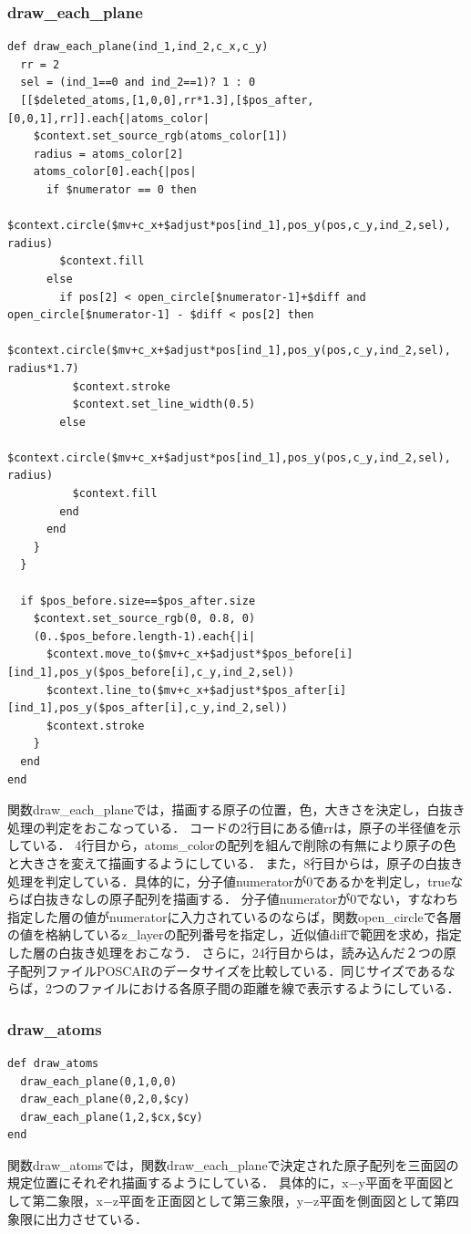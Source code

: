 \subsubsection{draw\_each\_plane}\begin{lstlisting}[style=customRuby,basicstyle={\scriptsize\ttfamily}]
def draw_each_plane(ind_1,ind_2,c_x,c_y)
  rr = 2
  sel = (ind_1==0 and ind_2==1)? 1 : 0
  [[$deleted_atoms,[1,0,0],rr*1.3],[$pos_after,[0,0,1],rr]].each{|atoms_color|
    $context.set_source_rgb(atoms_color[1])
    radius = atoms_color[2]
    atoms_color[0].each{|pos|
      if $numerator == 0 then
        $context.circle($mv+c_x+$adjust*pos[ind_1],pos_y(pos,c_y,ind_2,sel), radius)
        $context.fill
      else
        if pos[2] < open_circle[$numerator-1]+$diff and open_circle[$numerator-1] - $diff < pos[2] then
          $context.circle($mv+c_x+$adjust*pos[ind_1],pos_y(pos,c_y,ind_2,sel), radius*1.7)
          $context.stroke
          $context.set_line_width(0.5)
        else
          $context.circle($mv+c_x+$adjust*pos[ind_1],pos_y(pos,c_y,ind_2,sel), radius)
          $context.fill
        end
      end
    }
  }

  if $pos_before.size==$pos_after.size
    $context.set_source_rgb(0, 0.8, 0)
    (0..$pos_before.length-1).each{|i|
      $context.move_to($mv+c_x+$adjust*$pos_before[i][ind_1],pos_y($pos_before[i],c_y,ind_2,sel))
      $context.line_to($mv+c_x+$adjust*$pos_after[i][ind_1],pos_y($pos_after[i],c_y,ind_2,sel))
      $context.stroke
    }
  end
end
\end{lstlisting}
関数draw\_each\_planeでは，描画する原子の位置，色，大きさを決定し，白抜き処理の判定をおこなっている．
コードの2行目にある値rrは，原子の半径値を示している．
4行目から，atoms\_colorの配列を組んで削除の有無により原子の色と大きさを変えて描画するようにしている．
また，8行目からは，原子の白抜き処理を判定している．具体的に，分子値numeratorが0であるかを判定し，trueならば白抜きなしの原子配列を描画する．
分子値numeratorが0でない，すなわち指定した層の値がnumeratorに入力されているのならば，関数open\_circleで各層の値を格納しているz\_layerの配列番号を指定し，近似値diffで範囲を求め，指定した層の白抜き処理をおこなう．
さらに，24行目からは，読み込んだ２つの原子配列ファイルPOSCARのデータサイズを比較している．同じサイズであるならば，2つのファイルにおける各原子間の距離を線で表示するようにしている．

\subsubsection{draw\_atoms}\begin{lstlisting}[style=customRuby,basicstyle={\scriptsize\ttfamily}]
def draw_atoms
  draw_each_plane(0,1,0,0)    
  draw_each_plane(0,2,0,$cy)   
  draw_each_plane(1,2,$cx,$cy) 
end
\end{lstlisting}
関数draw\_atomsでは，関数draw\_each\_planeで決定された原子配列を三面図の規定位置にそれぞれ描画するようにしている．
具体的に，x−y平面を平面図として第二象限，x−z平面を正面図として第三象限，y−z平面を側面図として第四象限に出力させている．

